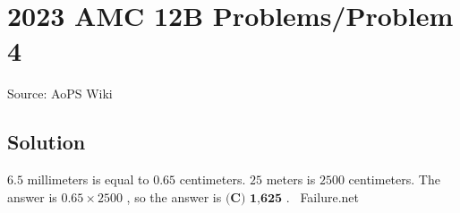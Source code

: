 \documentclass[12pt]{article}
\begin{document}
\section*{{2023 AMC 12B Problems/Problem 4}}
Source: AoPS Wiki

\subsection*{Solution}
$6.5$ millimeters is equal to $0.65$ centimeters. $25$ meters is $2500$ centimeters. The answer is $0.65 \times 2500$ , so the answer is $\boxed{\textbf{(C) 1,625}}$ . ~Failure.net
\end{document}
